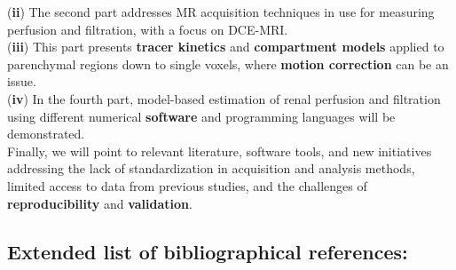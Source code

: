 \documentclass[11pt]{article}
\begin{document}
\noindent ({\bf ii}) The second part addresses MR acquisition techniques in use for measuring perfusion and filtration, with a focus on DCE-MRI.\\

\noindent ({\bf iii}) This part presents {\bf tracer kinetics} and {\bf compartment models} applied to parenchymal regions down to single voxels, where 
{\bf motion correction} can be an issue.\\

\noindent ({\bf iv}) In the fourth part, model-based estimation of renal perfusion and filtration using different numerical {\bf software} and programming languages 
will be demonstrated.\\

\noindent Finally, we will point to relevant literature, software tools, and new initiatives addressing the lack of standardization in acquisition and analysis methods, 
limited access to data from previous studies, and the challenges of {\bf reproducibility} and {\bf validation}.


\subsection*{Extended list of bibliographical references:}

\vspace{2mm}
\end{document}
